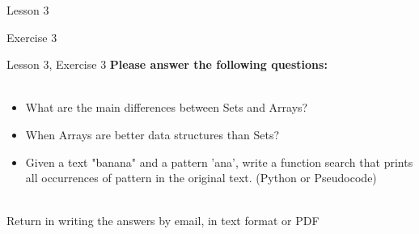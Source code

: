 \documentclass[aspectratio=1610]{beamer}
\begin{document}
\begin{frame}{Lesson 3}{}
\begin{center}
\Huge Exercise 3
\end{center}
\end{frame}

\begin{frame}{Lesson 3, Exercise 3}{}
\Large
\textbf{Please answer the following questions:}\\~\\ 

\Large{
\begin{itemize}
	\item What are the main differences between Sets and Arrays?
	\item When Arrays are better data structures than Sets?
	\item Given a text "banana" and a pattern 'ana', write a function search that prints all occurrences of pattern in the original text. (Python or Pseudocode)\\~\\
\end{itemize}}

Return in writing the answers by email, in text format or PDF
\end{frame}
\end{document}
